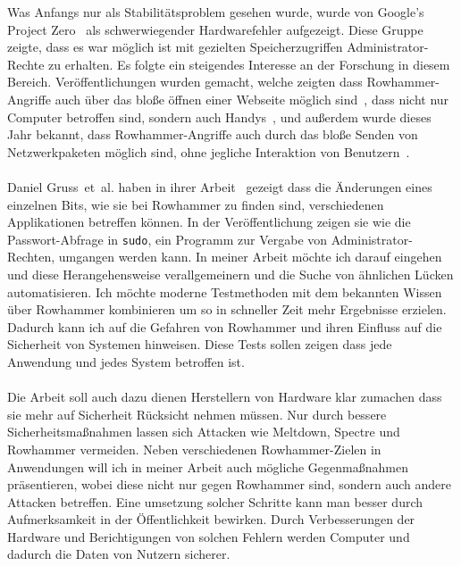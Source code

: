 \documentclass[a4paper]{article}
\newcommand{\etal}{et~al. }
\begin{document}
Was Anfangs nur als Stabilitätsproblem gesehen wurde, wurde von Google's Project Zero~\cite{projectzerorow} als schwerwiegender Hardwarefehler aufgezeigt. Diese Gruppe zeigte, dass es war möglich ist mit gezielten Speicherzugriffen Administrator-Rechte zu erhalten. Es folgte ein steigendes Interesse an der Forschung in diesem Bereich. Veröffentlichungen wurden gemacht, welche zeigten dass Rowhammer-Angriffe auch über das bloße öffnen einer Webseite möglich sind~\cite{rowhammerjs}, dass nicht nur Computer betroffen sind, sondern auch Handys~\cite{drammer}, und außerdem wurde dieses Jahr bekannt, dass Rowhammer-Angriffe auch durch das bloße Senden von Netzwerkpaketen möglich sind, ohne jegliche Interaktion von Benutzern~\cite{nethammer}.

\paragraph{}

Daniel Gruss~\etal haben in ihrer Arbeit~\cite{flipinthewall} gezeigt dass die Änderungen eines einzelnen Bits, wie sie bei Rowhammer zu finden sind, verschiedenen Applikationen betreffen können. In der Veröffentlichung zeigen sie wie die Passwort-Abfrage in \texttt{sudo}, ein Programm zur Vergabe von Administrator-Rechten, umgangen werden kann. In meiner Arbeit möchte ich darauf eingehen und diese Herangehensweise verallgemeinern und die Suche von ähnlichen Lücken automatisieren. Ich möchte moderne Testmethoden mit dem bekannten Wissen über Rowhammer kombinieren um so in schneller Zeit mehr Ergebnisse erzielen. Dadurch kann ich auf die Gefahren von Rowhammer und ihren Einfluss auf die Sicherheit von Systemen hinweisen. Diese Tests sollen zeigen dass jede Anwendung und jedes System betroffen ist.

\paragraph{}

Die Arbeit soll auch dazu dienen Herstellern von Hardware klar zumachen dass sie mehr auf Sicherheit Rücksicht nehmen müssen. Nur durch bessere Sicherheitsmaßnahmen lassen sich Attacken wie Meltdown, Spectre und Rowhammer vermeiden. Neben verschiedenen Rowhammer-Zielen in Anwendungen will ich in meiner Arbeit auch mögliche Gegenmaßnahmen präsentieren, wobei diese nicht nur gegen Rowhammer sind, sondern auch andere Attacken betreffen. Eine umsetzung solcher Schritte kann man besser durch Aufmerksamkeit in der Öffentlichkeit bewirken. Durch Verbesserungen der Hardware und Berichtigungen von solchen Fehlern werden Computer und dadurch die Daten von Nutzern sicherer.
\end{document}
